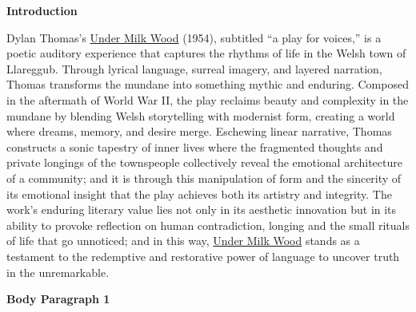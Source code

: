 	\textbf{Introduction}

		Dylan Thomas’s \underline{Under Milk Wood} (1954), subtitled “a play for voices,” is a poetic auditory experience that captures the rhythms of life in the Welsh town of Llareggub. Through lyrical language, surreal imagery, and layered narration, Thomas transforms the mundane into something mythic and enduring. Composed in the aftermath of World War II, the play reclaims beauty and complexity in the mundane by blending Welsh storytelling with modernist form, creating a world where dreams, memory, and desire merge. Eschewing linear narrative, Thomas constructs a sonic tapestry of inner lives where the fragmented thoughts and private longings of the townspeople collectively reveal the emotional architecture of a community; and it is through this manipulation of form and the sincerity of its emotional insight that the play achieves both its artistry and integrity. The work’s enduring literary value lies not only in its aesthetic innovation but in its ability to provoke reflection on human contradiction, longing and the small rituals of life that go unnoticed; and in this way, \underline{Under Milk Wood} stands as a testament to the redemptive and restorative power of language to uncover truth in the unremarkable.

	\textbf{Body Paragraph 1}

